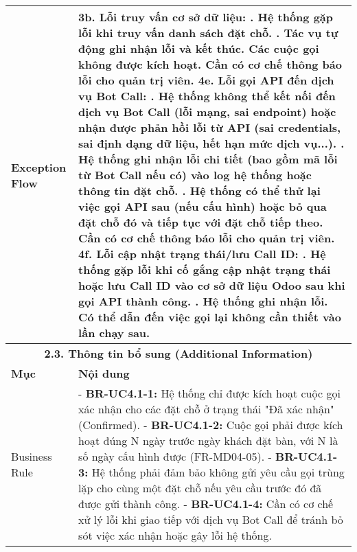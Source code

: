 \begin{longtable}{|m{4cm}|p{11cm}|}
Exception Flow & \textbf{3b. Lỗi truy vấn cơ sở dữ liệu:} \newline    1. Hệ thống gặp lỗi khi truy vấn danh sách đặt chỗ. \newline    2. Tác vụ tự động ghi nhận lỗi và kết thúc. Các cuộc gọi không được kích hoạt. Cần có cơ chế thông báo lỗi cho quản trị viên. \newline \textbf{4e. Lỗi gọi API đến dịch vụ Bot Call:} \newline    1. Hệ thống không thể kết nối đến dịch vụ Bot Call (lỗi mạng, sai endpoint) hoặc nhận được phản hồi lỗi từ API (sai credentials, sai định dạng dữ liệu, hết hạn mức dịch vụ...). \newline    2. Hệ thống ghi nhận lỗi chi tiết (bao gồm mã lỗi từ Bot Call nếu có) vào log hệ thống hoặc thông tin đặt chỗ. \newline    3. Hệ thống có thể thử lại việc gọi API sau (nếu cấu hình) hoặc bỏ qua đặt chỗ đó và tiếp tục với đặt chỗ tiếp theo. Cần có cơ chế thông báo lỗi cho quản trị viên. \newline \textbf{4f. Lỗi cập nhật trạng thái/lưu Call ID:} \newline    1. Hệ thống gặp lỗi khi cố gắng cập nhật trạng thái hoặc lưu Call ID vào cơ sở dữ liệu Odoo sau khi gọi API thành công. \newline    2. Hệ thống ghi nhận lỗi. Có thể dẫn đến việc gọi lại không cần thiết vào lần chạy sau. \\
\hline
\multicolumn{2}{|c|}{\textbf{2.3. Thông tin bổ sung (Additional Information)}} \\
\hline
\textbf{Mục} & \textbf{Nội dung} \\
\hline
Business Rule & - \textbf{BR-UC4.1-1:} Hệ thống chỉ được kích hoạt cuộc gọi xác nhận cho các đặt chỗ ở trạng thái "Đã xác nhận" (Confirmed). \newline - \textbf{BR-UC4.1-2:} Cuộc gọi phải được kích hoạt đúng N ngày trước ngày khách đặt bàn, với N là số ngày cấu hình được (FR-MD04-05). \newline - \textbf{BR-UC4.1-3:} Hệ thống phải đảm bảo không gửi yêu cầu gọi trùng lặp cho cùng một đặt chỗ nếu yêu cầu trước đó đã được gửi thành công. \newline - \textbf{BR-UC4.1-4:} Cần có cơ chế xử lý lỗi khi giao tiếp với dịch vụ Bot Call để tránh bỏ sót việc xác nhận hoặc gây lỗi hệ thống. \\
\hline

\end{longtable}
